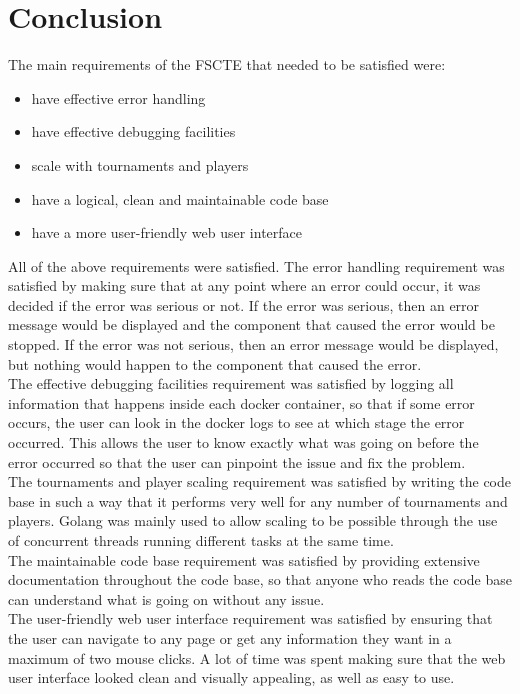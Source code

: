 \documentclass[a4paper, 12pt]{report}
\begin{document}
\chapter{Conclusion}
\label{chap:conclusion}

The main requirements of the FSCTE that needed to be satisfied were:
\begin{itemize}
	\item have effective error handling
	\item have effective debugging facilities
	\item scale with tournaments and players
	\item have a logical, clean and maintainable code base
	\item have a more user-friendly web user interface
\end{itemize}
All of the above requirements were satisfied. The error handling requirement
was satisfied by making sure that at any point where an error could occur, it
was decided if the error was serious or not. If the error was serious, then an
error message would be displayed and the component that caused the error would
be stopped. If the error was not serious, then an error message would be displayed,
but nothing would happen to the component that caused the error. \\

The effective debugging facilities requirement was satisfied by logging all
information that happens inside each docker container, so that if some error
occurs, the user can look in the docker logs to see at which stage the error
occurred. This allows the user to know exactly what was going on before the
error occurred so that the user can pinpoint the issue and fix the problem. \\

The tournaments and player scaling requirement was satisfied by writing the
code base in such a way that it performs very well for any number of tournaments
and players. Golang was mainly used to allow scaling to be possible through the
use of concurrent threads running different tasks at the same time. \\

The maintainable code base requirement was satisfied by providing extensive
documentation throughout the code base, so that anyone who reads the code base
can understand what is going on without any issue. \\

The user-friendly web user interface requirement was satisfied by ensuring that
the user can navigate to any page or get any information they want in a maximum
of two mouse clicks. A lot of time was spent making sure that the web user
interface looked clean and visually appealing, as well as easy to use. \\
\end{document}
